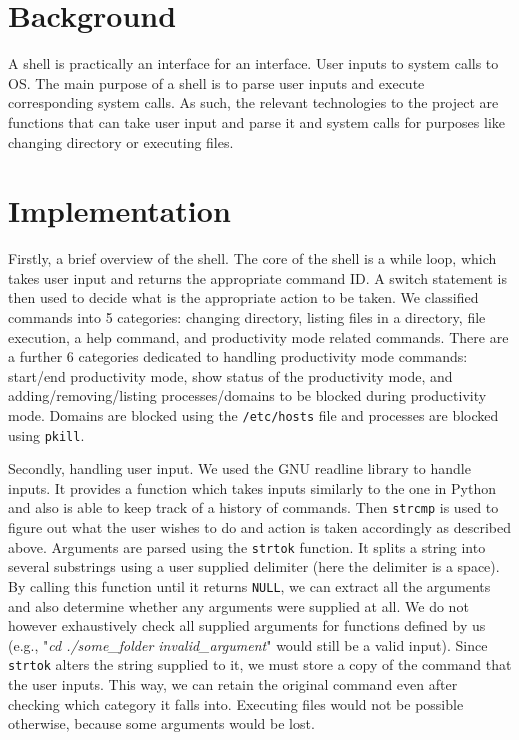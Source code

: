 \documentclass{article}
\begin{document}
\section{Background}

A shell is practically an interface for an interface. User inputs to system calls to OS. The main purpose of a shell is to parse user inputs and execute corresponding system calls. As such, the relevant technologies to the project are functions that can take user input and parse it and system calls for purposes like changing directory or executing files.

\section{Implementation}

Firstly, a brief overview of the shell. The core of the shell is a while loop, which takes user input and returns the appropriate command ID. A switch statement is then used to decide what is the appropriate action to be taken. We classified commands into 5 categories: changing directory, listing files in a directory, file execution, a help command, and productivity mode related commands. There are a further 6 categories dedicated to handling productivity mode commands: start/end productivity mode, show status of the productivity mode, and adding/removing/listing processes/domains to be blocked during productivity mode. Domains are blocked using the \texttt{/etc/hosts} file and processes are blocked using \texttt{pkill}.

Secondly, handling user input. We used the GNU readline library to handle inputs. It provides a function which takes inputs similarly to the one in Python and also is able to keep track of a history of commands.  Then  \texttt{strcmp} is used to figure out what the user wishes to do and action is taken accordingly as described above. Arguments are parsed using the  \texttt{strtok} function. It splits a string into several substrings using a user supplied delimiter (here the delimiter is a space). By calling this function until it returns  \texttt{NULL}, we can extract all the arguments and also determine whether any arguments were supplied at all. We do not however exhaustively check all supplied arguments for functions defined by us (e.g., "\textit{cd ./some\_folder invalid\_argument}" would still be a valid input). Since  \texttt{strtok} alters the string supplied to it, we must store a copy of the command that the user inputs. This way, we can retain the original command even after checking which category it falls into. Executing files would not be possible otherwise, because some arguments would be lost.
\end{document}
